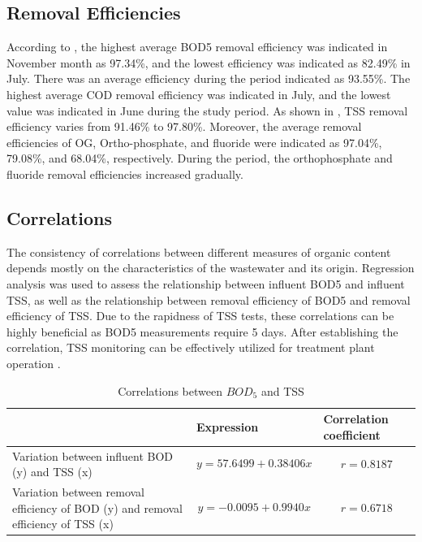 \subsection{Removal Efficiencies}
According to , the highest average \ac{BOD5} removal efficiency was indicated in November month as 97.34\%, and the lowest efficiency was indicated as 82.49\% in July. There was an average efficiency during the period indicated as 93.55\%. The highest average \ac{COD} removal efficiency was indicated in July, and the lowest value was indicated in June during the study period. As shown in , \ac{TSS} removal efficiency varies from 91.46\% to 97.80\%.  Moreover, the average removal efficiencies of \ac{OG}, Ortho-phosphate, and fluoride were indicated as 97.04\%, 79.08\%, and 68.04\%, respectively. During the period, the orthophosphate and fluoride removal efficiencies increased gradually.



\subsection{Correlations}
The consistency of correlations between different measures of organic content depends mostly on the characteristics of the wastewater and its origin. Regression analysis was used to assess the relationship between influent \ac{BOD5} and influent \ac{TSS}, as well as the relationship between removal efficiency of \ac{BOD5} and removal efficiency of \ac{TSS}. Due to the rapidness of \ac{TSS} tests, these correlations can be highly beneficial as \ac{BOD5} measurements require 5 days. After establishing the correlation, \ac{TSS} monitoring can be effectively utilized for treatment plant operation \cite{Kumar2010}.

\begin{table}
    \centering
    \caption{Correlations between $BOD_5$ and TSS}
    \begin{tabular}{|>{\raggedright\arraybackslash}p{5.5cm}|p{5.5cm}|p{4 cm}|}
    \hline
          & Expression & Correlation coefficient\\
          \hline
         Variation between influent BOD (y) and TSS (x) & $$y = 57.6499 + 0.38406x $$ & $$ r = 0.8187 $$ \\
         \hline
         Variation between removal efficiency of BOD (y) and removal efficiency of TSS (x) & $$y = -0.0095 + 0.9940 x$$& $$r = 0.6718$$\\
         \hline
    \end{tabular}
    \label{tab:BOD_TSS_correlations}
\end{table}

